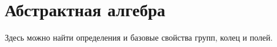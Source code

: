 \chapter{Абстрактная алгебра}
Здесь можно найти определения и базовые свойства групп, колец и полей.






